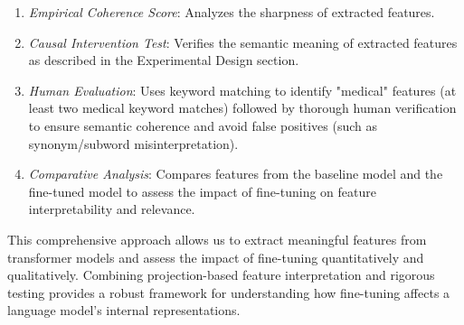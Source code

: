 \begin{enumerate}
    \item \textit{Empirical Coherence Score}: Analyzes the sharpness of extracted features.
    \item \textit{Causal Intervention Test}: Verifies the semantic meaning of extracted features as described in the Experimental Design section.
    \item \textit{Human Evaluation}: Uses keyword matching to identify "medical" features (at least two medical keyword matches) followed by thorough human verification to ensure semantic coherence and avoid false positives (such as synonym/subword misinterpretation).
    \item \textit{Comparative Analysis}: Compares features from the baseline model and the fine-tuned model to assess the impact of fine-tuning on feature interpretability and relevance.
\end{enumerate}

This comprehensive approach allows us to extract meaningful features from transformer models and assess the impact of fine-tuning quantitatively and qualitatively. Combining projection-based feature interpretation and rigorous testing provides a robust framework for understanding how fine-tuning affects a language model's internal representations.
